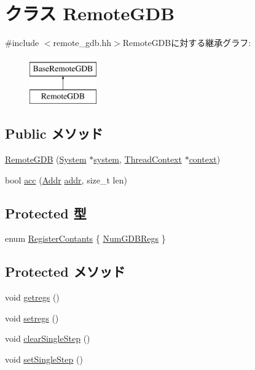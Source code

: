 \hypertarget{classX86ISA_1_1RemoteGDB}{
\section{クラス RemoteGDB}
\label{classX86ISA_1_1RemoteGDB}
}


{\ttfamily \#include $<$remote\_\-gdb.hh$>$}RemoteGDBに対する継承グラフ:\begin{figure}[H]
\begin{center}
\leavevmode
\includegraphics[height=2cm]{classX86ISA_1_1RemoteGDB}
\end{center}
\end{figure}
\subsection*{Public メソッド}
\begin{DoxyCompactItemize}
\item 
\hyperlink{classX86ISA_1_1RemoteGDB_a7d97c5a4edd8630299b2b0521ae32d98}{RemoteGDB} (\hyperlink{classSystem}{System} $\ast$\hyperlink{classBaseRemoteGDB_af27ccd765f13a4b7bd119dc7579e2746}{system}, \hyperlink{classThreadContext}{ThreadContext} $\ast$\hyperlink{classBaseRemoteGDB_a9684dd9218c7836517670f8a0d8f3df7}{context})
\item 
bool \hyperlink{classX86ISA_1_1RemoteGDB_ac4c7be164f087f2f53d137d9768809a7}{acc} (\hyperlink{base_2types_8hh_af1bb03d6a4ee096394a6749f0a169232}{Addr} \hyperlink{namespaceX86ISA_ab705917f60c5566f9ce56a93f798b2e2}{addr}, size\_\-t len)
\end{DoxyCompactItemize}
\subsection*{Protected 型}
\begin{DoxyCompactItemize}
\item 
enum \hyperlink{classX86ISA_1_1RemoteGDB_a9a48f761c00e727a19384b14f11b19d2}{RegisterContants} \{ \hyperlink{classX86ISA_1_1RemoteGDB_a9a48f761c00e727a19384b14f11b19d2a811ff1e724004c1673663ccdea46e573}{NumGDBRegs}
 \}
\end{DoxyCompactItemize}
\subsection*{Protected メソッド}
\begin{DoxyCompactItemize}
\item 
void \hyperlink{classX86ISA_1_1RemoteGDB_a62bc8adc5a48f1cbb5eb9bb64301d38d}{getregs} ()
\item 
void \hyperlink{classX86ISA_1_1RemoteGDB_a2051121b6bc93c8ca3856bbeeca7bdc1}{setregs} ()
\item 
void \hyperlink{classX86ISA_1_1RemoteGDB_afd89268069d9026378b06b08c97f65f8}{clearSingleStep} ()
\item 
void \hyperlink{classX86ISA_1_1RemoteGDB_a40d5da340fdb741de8cd3ffbc69708fe}{setSingleStep} ()
\end{DoxyCompactItemize}

